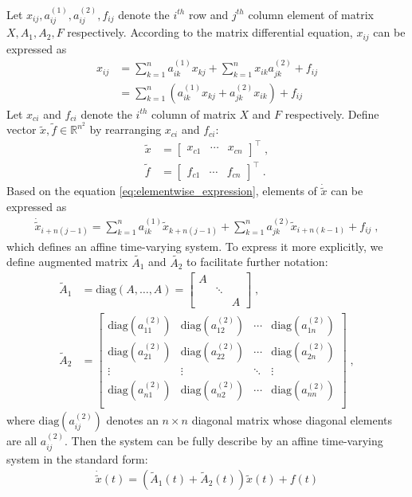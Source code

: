 \documentclass[a4paper,10.5pt]{article}
\newcommand{\R}{\mathbb{R}}
\begin{document}
Let $x_{ij},a^{(1)}_{ij},a^{(2)}_{ij},f_{ij}$ denote the $i^{th}$ row and $j^{th}$ column element of matrix $X,A_1,A_2,F$ respectively. According to the matrix differential equation, $x_{ij}$ can be expressed as
\begin{align}
\label{eq:elementwise_expression}
x_{ij} &= \sum_{k=1}^{n} a^{(1)}_{ik}x_{kj} + \sum_{k=1}^{n}x_{ik}a^{(2)}_{jk} + f_{ij} \nonumber \\
&= \sum_{k=1}^{n} \left(a^{(1)}_{ik}x_{kj} + a^{(2)}_{jk}x_{ik}\right) + f_{ij}
\end{align}
Let $x_{ci}$ and $f_{ci}$ denote the $i^{th}$ column of matrix $X$ and $F$ respectively. Define vector $\tilde{x},\tilde{f}\in \R^{n^2}$ by rearranging $x_{ci}$ and $f_{ci}$:
\begin{align*}
\tilde{x} &= \begin{bmatrix}x_{c1} & \cdots & x_{cn}\end{bmatrix}^\top \; ,\\
\tilde{f} &= \begin{bmatrix}f_{c1} & \cdots & f_{cn}\end{bmatrix}^\top \; .
\end{align*}
Based on the equation \eqref{eq:elementwise_expression}, elements of $\dot{\tilde{x}}$ can be expressed as
\begin{align}
\label{eq:linear_combination}
\dot{\tilde{x}}_{i+n(j-1)} = \sum_{k=1}^{n} a^{(1)}_{ik}\tilde{x}_{k+n(j-1)} + \sum_{k=1}^{n}a^{(2)}_{jk}\tilde{x}_{i+n(k-1)} + f_{ij} \; ,
\end{align}
which defines an affine time-varying system. To express it more explicitly, we define augmented matrix $\tilde{A_1}$ and $\tilde{A_2}$ to facilitate further notation:
\begin{align*}
\tilde{A}_1 &= \text{diag}(A, \dots, A) = \begin{bmatrix}
A &        &   \\
  & \ddots &   \\
  &        & A
\end{bmatrix} \; , \\
\tilde{A}_2 &= \begin{bmatrix}
\text{diag}(a^{(2)}_{11}) & \text{diag}(a^{(2)}_{12}) & \cdots &\text{diag}(a^{(2)}_{1n}) \\
\text{diag}(a^{(2)}_{21}) & \text{diag}(a^{(2)}_{22}) & \cdots &\text{diag}(a^{(2)}_{2n}) \\
\vdots & \vdots & \ddots & \vdots \\
\text{diag}(a^{(2)}_{n1}) & \text{diag}(a^{(2)}_{n2}) & \cdots &\text{diag}(a^{(2)}_{nn}) \\
\end{bmatrix} \; ,
\end{align*}
where $\text{diag}(a^{(2)}_{ij})$ denotes an $n \times n$ diagonal matrix whose diagonal elements are all $a^{(2)}_{ij}$. Then the system can be fully describe by an affine time-varying system in the standard form:
\begin{align*}
\dot{\tilde{x}}(t) = \left(\tilde{A}_1(t)+\tilde{A}_2(t)\right)\tilde{x}(t)+f(t)
\end{align*} \par
\end{document}
